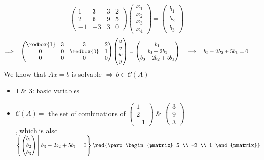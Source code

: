 \begin{itemize}
    \[
    \begin{pmatrix}
        1 & 3 & 3 & 2 \\
        2 & 6 & 9 & 5 \\
        -1 & -3 & 3 & 0
    \end{pmatrix} \begin{pmatrix}
        x_1 \\ x_2 \\ x_3 \\ x_4
    \end{pmatrix} = \begin{pmatrix}
        b_1 \\ b_2 \\ b_3
    \end{pmatrix}
    \]
    \[
    \Longrightarrow \quad \begin{pmatrix}
        \redbox{1} & 3 & 3 & 2 \\
        0 & 0 & \redbox{3} & 1 \\
        0 & 0 & 0 & 0
    \end{pmatrix} \begin{pmatrix}
        u \\ v \\ w \\ y
    \end{pmatrix} = \begin{pmatrix}
        b_1 \\ b_2 - 2b_1 \\ b_3 - 2b_2 + 5b_1
    \end{pmatrix} \quad \longrightarrow \quad b_3 - 2b_2 + 5b_1 = 0
    \]
    We know that $Ax = b$ is solvable $\Rightarrow \ b \in \mathcal{C}(A)$ 
    \begin{itemize}
        \item 1 \& 3: basic variables
        \item $\mathcal{C}(A) = $ the set of combinations of \( \begin{pmatrix}
            1 \\ 2 \\ -1
        \end{pmatrix} \) \& \( \begin{pmatrix}
            3 \\ 9 \\ 3
        \end{pmatrix} \) \\ 
        , which is also \( \left\{ \begin{pmatrix}
        b_1 \\ b_2 \\ b_3
        \end{pmatrix} \;\middle|\; b_3 - 2b_2 + 5b_1 = 0 \right\} \red{\perp \begin{pmatrix}
            5 \\ -2 \\ 1
        \end{pmatrix}} \)
    \end{itemize}
    

\end{itemize}
